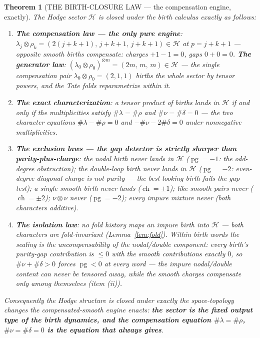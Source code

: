 \documentclass[11pt]{article}
\newtheorem{theorem}{Theorem}[section]
\begin{document}
\begin{theorem}[THE BIRTH-CLOSURE LAW — the compensation engine, exactly]
\label{thm:birth}
The Hodge sector $\mathcal{H}$ is closed under the birth calculus exactly as follows:
\begin{enumerate}
\item[(i)] \textbf{The compensation law — the only pure engine}: $\lambda_j\otimes\rho_k=(2(j+k+1),\,j+k+1,\,j+k+1)\in\mathcal{H}$ at $p=j+k+1$ — opposite smooth births compensate: charges $+1-1=0$, gaps $0+0=0$. \textbf{The generator law}: $(\lambda_0\otimes\rho_0)^{\otimes m}=(2m,\,m,\,m)\in\mathcal{H}$ — the single compensation pair $\lambda_0\otimes\rho_0=(2,1,1)$ births the \emph{whole sector} by tensor powers, and the Tate folds reparametrize within it.
\item[(ii)] \textbf{The exact characterization}: a tensor product of births lands in $\mathcal{H}$ \emph{if and only if} the multiplicities satisfy $\#\lambda=\#\rho$ \emph{and} $\#\nu=\#\delta=0$ — the two character equations $\#\lambda-\#\rho=0$ and $-\#\nu-2\#\delta=0$ under nonnegative multiplicities.
\item[(iii)] \textbf{The exclusion laws — the gap detector is strictly sharper than parity-plus-charge}: the nodal birth never lands in $\mathcal{H}$ ($\operatorname{pg}=-1$: the odd-degree obstruction); the \emph{double-loop} birth never lands in $\mathcal{H}$ ($\operatorname{pg}=-2$: \emph{even-degree diagonal charge is not purity} — the best-looking birth fails the gap test); a single smooth birth never lands ($\operatorname{ch}=\pm1$); like-smooth pairs never ($\operatorname{ch}=\pm2$); $\nu\otimes\nu$ never ($\operatorname{pg}=-2$); every impure mixture never (both characters additive).
\item[(iv)] \textbf{The isolation law}: no fold history maps an impure birth into $\mathcal{H}$ — both characters are fold-invariant (Lemma~\ref{lem:fold}). Within birth words the sealing is the \emph{uncompensability of the nodal/double component}: every birth's purity-gap contribution is $\le 0$ with the smooth contributions exactly $0$, so $\#\nu+\#\delta>0$ forces $\operatorname{pg}<0$ at every word — the impure nodal/double content can never be tensored away, while the smooth charges compensate only among themselves (item (ii)).
\end{enumerate}
Consequently the Hodge structure is closed under exactly the space-topology changes the \emph{compensated-smooth} engine enacts: \textbf{the sector is the fixed output type of the birth dynamics, and the compensation equation $\#\lambda=\#\rho$, $\#\nu=\#\delta=0$ is the equation that always gives}.
\end{theorem}
\end{document}
